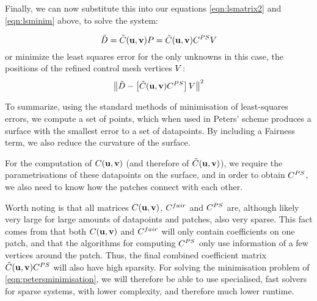Finally, we can now substitute this into our equations \ref{eqn:lsmatrix2} and \ref{eqn:lsminim} above, to solve the system:

\begin{equation}
\lsDataPointConcMatrix = \lsControlCoefConcMatrix(\vec{u},\vec{v})\lsControlPointMatrix = \lsControlCoefConcMatrix(\vec{u},\vec{v})\petersControlPointCoefMatrix\petersPatchPointMatrix
\end{equation}
or minimize the least squares error for the only unknowns in this case, the positions of the refined control mesh vertices $\petersPatchPointMatrix$:
\begin{equation}
\norm{\lsDataPointConcMatrix - \left [\lsControlCoefConcMatrix(\vec{u},\vec{v})\petersControlPointCoefMatrix\right ]\petersPatchPointMatrix}^2
\label{eqn:petersminimisation}
\end{equation}

To summarize, using the standard methods of minimisation of least-squares errors, we compute a set of points, which when used in Peters' scheme produces a surface with the smallest error to a set of datapoints. By including a Fairness term, we also reduce the curvature of the surface.

For the computation of  $\lsControlPointCoefMatrix(\vec{u},\vec{v})$ (and therefore of $\lsControlCoefConcMatrix(\vec{u},\vec{v})$), we require the parametrisations of these datapoints on the surface, and in order to obtain $\petersControlPointCoefMatrix$, we also need to know how the patches connect with each other. 

Worth noting is that all matrices $\lsControlPointCoefMatrix(\vec{u},\vec{v})$, $\lsControlPointCoefMatrix^{fair}$ and $\petersControlPointCoefMatrix$ are, although likely very large for large amounts of datapoints and patches, also very sparse. This fact comes from that both $\lsControlPointCoefMatrix(\vec{u},\vec{v})$ and $\lsControlPointCoefMatrix^{fair}$ will only contain coefficients on one patch, and that the algorithms for computing $\petersControlPointCoefMatrix$ only use information of a few vertices around the patch. Thus, the final combined coefficient matrix $\lsControlCoefConcMatrix(\vec{u},\vec{v})\petersControlPointCoefMatrix$ will also have high sparsity. For solving the minimisation problem of \autoref{eqn:petersminimisation}, we will therefore be able to use specialised, fast solvers for sparse systems, with lower complexity, and therefore much lower runtime.
